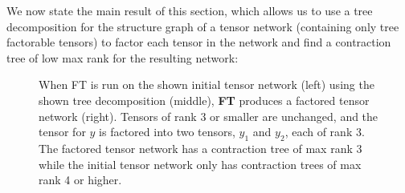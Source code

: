 
We now state the main result of this section, which allows us to use a tree decomposition for the structure graph of a tensor network (containing only tree factorable tensors) to factor each tensor in the network and find a contraction tree of low max rank for the resulting network:
\begin{figure}[t]
	\centering
	
	\hspace{1cm}
	
	\hspace{1cm}
	
	\caption{\label{fig:factor-example} When FT is run on the shown initial tensor network (left) using the shown tree decomposition (middle), \textbf{FT} produces a factored tensor network (right). Tensors of rank 3 or smaller are unchanged, and the tensor for $y$ is factored into two tensors, $y_1$ and $y_2$, each of rank 3. The factored tensor network has a contraction tree of max rank 3 while the initial tensor network only has contraction trees of max rank 4 or higher.}
\end{figure}


